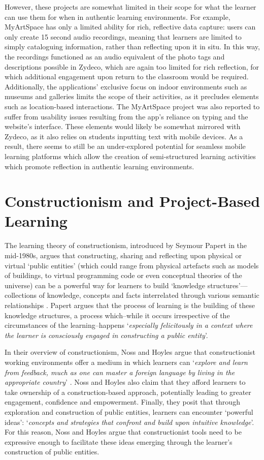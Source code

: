 However, these projects are somewhat limited in their scope for what the learner can use them for when in authentic learning environments. For example, MyArtSpace has only a limited ability for rich, reflective data capture: users can only create 15 second audio recordings, meaning that learners are limited to simply cataloguing information, rather than reflecting upon it in situ. In this way, the recordings functioned as an audio equivalent of the photo tags and descriptions possible in Zydeco, which are again too limited for rich reflection, for which additional engagement upon return to the classroom would be required. Additionally, the applications' exclusive focus on indoor environments such as museums and galleries limits the scope of their activities, as it precludes elements such as location-based interactions. The MyArtSpace project was also reported to suffer from usability issues resulting from the app’s reliance on typing and the website’s interface. These elements would likely be somewhat mirrored with Zydeco, as it also relies on students inputting text with mobile devices. As a result, there seems to still be an under-explored potential for seamless mobile learning platforms which allow the creation of semi-structured learning activities which promote reflection in authentic learning environments.


\section{Constructionism and Project-Based Learning}

The learning theory of constructionism, introduced by Seymour Papert in the mid-1980s, argues that constructing, sharing and reflecting upon physical or virtual `public entities' (which could range from physical artefacts such as models of buildings, to virtual programming code or even conceptual theories of the universe) can be a powerful way for learners to build `knowledge structures'---collections of knowledge, concepts and facts interrelated through various semantic relationships \citep{PapertSeymourandHarel1991a}. Papert argues that the process of learning is the building of these knowledge structures, a process which--while it occurs irrespective of the circumstances of the learning--happens `\textit{especially felicitously in a context where the learner is consciously engaged in constructing a public entity}'. 

In their overview of constructionism, Noss and Hoyles argue that constructionist working environments offer a medium in which learners can `\textit{explore and learn from feedback, much as one can master a foreign language by living in the appropriate country}' \citep{Noss2017}. Noss and Hoyles also claim that they afford learners to take ownership of a construction-based approach, potentially leading to greater engagement, confidence and empowerment. Finally, they posit that through exploration and construction of public entities, learners can encounter `powerful ideas': `\textit{concepts and strategies  that confront and build upon intuitive knowledge}'. For this reason, Noss and Hoyles argue that constructionist tools need to be expressive enough to facilitate these ideas emerging through the learner's construction of public entities.

